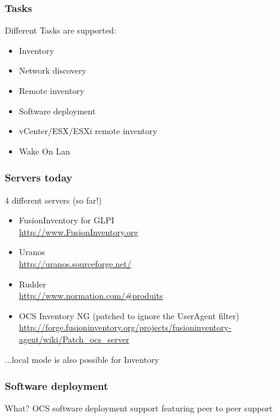 \documentclass{beamer}
\begin{document}
\begin{frame}
    \frametitle{Tasks}
    Different Tasks are supported:
    \begin{itemize}

        \item Inventory
        \item Network discovery
        \item Remote inventory
        \item Software deployment
        \item vCenter/ESX/ESXi remote inventory
        \item Wake On Lan
    \end{itemize}
\end{frame}

\begin{frame}
    \frametitle{Servers today}

    \begin{block}{4 different servers (so far!)}
        \begin{itemize}
            \item FusionInventory for GLPI \\
            \url{http://www.FusionInventory.org}
            \item Uranos \\
            \url{http://uranos.sourceforge.net/}
            \item Rudder \\
            \url{http://www.normation.com/\#produits}
            \item OCS Inventory NG (patched to ignore the UserAgent filter) \\
            \url{http://forge.fusioninventory.org/projects/fusioninventory-agent/wiki/Patch\_ocs\_server}
        \end{itemize}
        ...local mode is also possible for Inventory
    \end{block}

\end{frame}

\begin{frame}
    \frametitle{Software deployment}

    \begin{block}{What?}
    OCS software deployment support featuring peer to peer support
    \end{block}
\end{frame}

%
\end{document}
